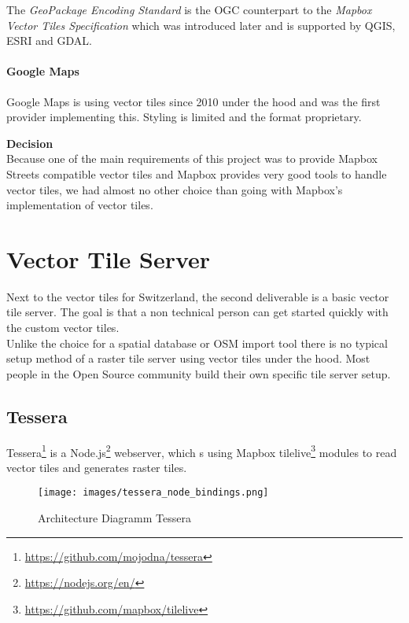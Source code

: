 The \emph{GeoPackage Encoding Standard} is the OGC counterpart to the
\emph{Mapbox Vector Tiles Specification} which was introduced later and
is supported by QGIS, ESRI and GDAL.

\paragraph{Google Maps}

Google Maps is using vector tiles since 2010 under the hood and was the
first provider implementing this. Styling is limited and the format
proprietary.

\begin{tcolorbox}
\textbf{Decision} \\
Because one of the main requirements of this project was to provide Mapbox Streets compatible vector tiles and Mapbox provides very good tools to handle vector tiles, we had almost no other choice than going with Mapbox's implementation of vector tiles.
\end{tcolorbox}

\section{Vector Tile Server}\label{vector_tile_server}

Next to the vector tiles for Switzerland, the second deliverable is a basic vector tile server. The goal is that a non technical person can get started quickly with the custom vector tiles.\\

Unlike the choice for a spatial database or OSM import tool
there is no typical setup method of a raster tile server using vector tiles under the hood. Most people in the Open Source community build their own specific tile server setup.

\subsection{Tessera}\label{tessera}

Tessera\footnote{\url{https://github.com/mojodna/tessera}} is a Node.js\footnote{\url{https://nodejs.org/en/}} webserver, which s using Mapbox tilelive\footnote{\url{https://github.com/mapbox/tilelive}} modules to read vector tiles and generates raster tiles.

\begin{figure}[H]
\centering
  \texttt{[image: images/tessera\_node\_bindings.png]}
  \caption{Architecture Diagramm Tessera}
\end{figure}

